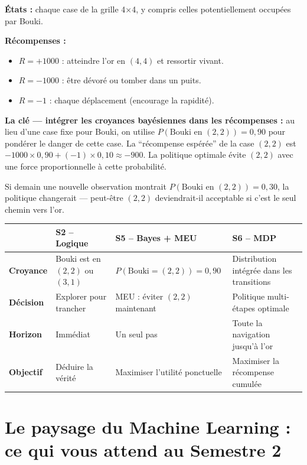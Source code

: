 \documentclass[11pt,a4paper]{article}
\begin{document}
\begin{exemplebox}
\textbf{États :} chaque case de la grille 4×4, y compris celles potentiellement occupées par Bouki.

\textbf{Récompenses :}
\begin{itemize}[nosep]
    \item $R = +1000$ : atteindre l'or en $(4,4)$ et ressortir vivant.
    \item $R = -1000$ : être dévoré ou tomber dans un puits.
    \item $R = -1$ : chaque déplacement (encourage la rapidité).
\end{itemize}

\textbf{La clé --- intégrer les croyances bayésiennes dans les récompenses :} au lieu d'une case fixe pour Bouki, on utilise $P(\text{Bouki en }(2,2)) = 0{,}90$ pour pondérer le danger de cette case. La ``récompense espérée'' de la case $(2,2)$ est $-1000 \times 0{,}90 + (-1) \times 0{,}10 \approx -900$. La politique optimale évite $(2,2)$ avec une force proportionnelle à cette probabilité.

Si demain une nouvelle observation montrait $P(\text{Bouki en }(2,2)) = 0{,}30$, la politique changerait --- peut-être $(2,2)$ deviendrait-il acceptable si c'est le seul chemin vers l'or.
\end{exemplebox}

\begin{center}
\renewcommand{\arraystretch}{1.4}
\begin{tabular}{lp{3.5cm}p{3.5cm}p{3.5cm}}
\toprule
& \textbf{S2 -- Logique} & \textbf{S5 -- Bayes + MEU} & \textbf{S6 -- MDP} \\
\midrule
\textbf{Croyance} & Bouki est en $(2,2)$ ou $(3,1)$ & $P(\text{Bouki}=(2,2))=0{,}90$ & Distribution intégrée dans les transitions \\
\textbf{Décision} & Explorer pour trancher & MEU : éviter $(2,2)$ maintenant & Politique multi-étapes optimale \\
\textbf{Horizon} & Immédiat & Un seul pas & Toute la navigation jusqu'à l'or \\
\textbf{Objectif} & Déduire la vérité & Maximiser l'utilité ponctuelle & Maximiser la récompense cumulée \\
\bottomrule
\end{tabular}
\end{center}

\section{Le paysage du Machine Learning : ce qui vous attend au Semestre 2}
\end{document}
